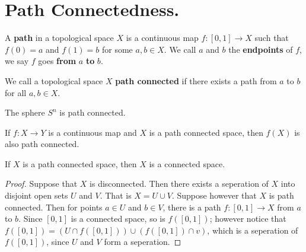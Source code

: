 
\section{Path Connectedness.}

\begin{definition}
    A \textbf{path} in a topological space $X$ is a continuous map  $f:[0,1]
    \xrightarrow{} X$ such that $f(0)=a$ and $f(1)=b$ for some $a,b \in X$. We
    call  $a$ and  $b$ the  \textbf{endpoints} of $f$, we say $f$ goes
    \textbf{from} $a$  \textbf{to} $b$.
\end{definition}

\begin{definition}
    We call a topological space $X$ \textbf{path connected} if there exists a
    path from $a$ to $b$ for all $a,b \in X$.
\end{definition}

\begin{example}\label{2.8}
    The sphere $S^n$ is path connected.
\end{example}

\begin{lemma}\label{2.4.1}
    If $f:X \xrightarrow{} Y$ is a continuous map and $X$ is a path connected
    space, then  $f(X)$ is also path connected.
\end{lemma}

\begin{theorem}\label{2.4.2}
    If $X$ is a path connected space, then  $X$ is a connected space.
\end{theorem}
\begin{proof}
    Suppose that $X$ is disconnected. Then there exists a seperation of $X$ into
    disjoint open sets  $U$ and $V$. That is  $X=U \cup V$. Suppose however that
     $X$ is path connected. Then for points  $a \in U$ and  $b \in V$, there is
     a path  $f:[0,1] \xrightarrow{} X$ from $a$ to  $b$. Since  $[0,1]$ is a
     connected space, so is $f([0,1])$; however notice that $f([0,1])=(U \cap
     f([0,1])) \cup (f([0,1]) \cap v)$, which is a seperation of $f([0,1])$,
     since $U$ and  $V$ form a seperation.
\end{proof}

